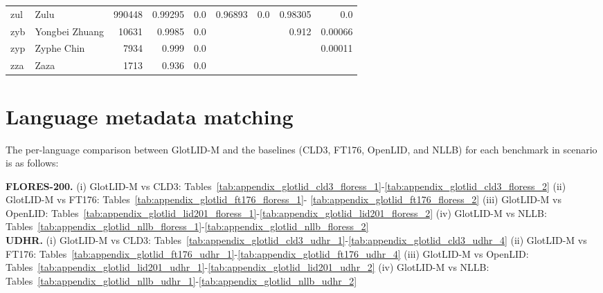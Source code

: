 \documentclass[11pt]{article}
\def\modelname{\mbox{GlotLID-M}\xspace}
\def\corpusname{\mbox{GlotLID-C}\xspace}
\def\flores{FLORES\xspace}
\def\udhr{UDHR\xspace}
\def\ft176{FT176\xspace}
\def\edin{OpenLID\xspace}
\def\nllb{NLLB\xspace}
\def\seclabel#1{\label{sec:#1}\label{p:#1}}
\begin{document}
\begin{table*}[h]
{\begin{tabular}{llrrrrrrr}
zul         & Zulu         & 990448         & 0.99295         & 0.0         & 0.96893         & 0.0         & 0.98305         & 0.0         \\

zyb         & Yongbei Zhuang         & 10631         & 0.9985         & 0.0         &          &          & 0.912         & 0.00066         \\

zyp         & Zyphe Chin         & 7934         & 0.999         & 0.0         &          &          &          & 0.00011         \\

zza         & Zaza         & 1713         & 0.936         & 0.0         &          &          &          &    \\
\end{tabular}
    }
    \caption{Performance of \modelname on \corpusname test, \flores-200 and \udhr benchmarks (part 25)}\label{tab:appendix_glot_per_lang_25}\end{table*} 

\section{Language metadata matching}\seclabel{metadata-match}

The per-language comparison between \modelname and the
baselines (CLD3, \ft176, \edin, and \nllb) for each
benchmark in scenario  is as follows:

\textbf{FLORES-200.}
    (i) \modelname vs CLD3: Tables~\ref{tab:appendix_glotlid_cld3_floress_1}-\ref{tab:appendix_glotlid_cld3_floress_2}
    (ii) \modelname vs \ft176: Tables~\ref{tab:appendix_glotlid_ft176_floress_1}-
\ref{tab:appendix_glotlid_ft176_floress_2}
    (iii) \modelname vs \edin: Tables~\ref{tab:appendix_glotlid_lid201_floress_1}-\ref{tab:appendix_glotlid_lid201_floress_2}
    (iv)  \modelname vs \nllb:  Tables~\ref{tab:appendix_glotlid_nllb_floress_1}-\ref{tab:appendix_glotlid_nllb_floress_2}\\

\textbf{UDHR.}
    (i) \modelname vs CLD3: Tables~\ref{tab:appendix_glotlid_cld3_udhr_1}-\ref{tab:appendix_glotlid_cld3_udhr_4}
    (ii) \modelname vs \ft176: Tables~\ref{tab:appendix_glotlid_ft176_udhr_1}-\ref{tab:appendix_glotlid_ft176_udhr_4}
    (iii) \modelname vs \edin: Tables~\ref{tab:appendix_glotlid_lid201_udhr_1}-\ref{tab:appendix_glotlid_lid201_udhr_2}
    (iv)  \modelname vs \nllb: Tables~\ref{tab:appendix_glotlid_nllb_udhr_1}-\ref{tab:appendix_glotlid_nllb_udhr_2}\\
\end{document}
